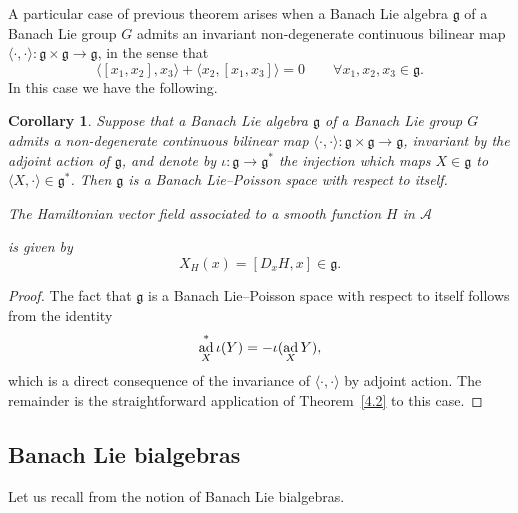 \documentclass[a4paper,12pt,reqno]{amsart}%
\newtheorem{corollary}[theorem]{Corollary}
\theoremstyle{definition}
\theoremstyle{remark}
\numberwithin{theorem}{section}
\numberwithin{equation}{section}
\newcommand{\1}{{\bf 1}}
\DeclareMathOperator{\ad}{\textnormal{ad}}
\newcommand{\g}{{\mathfrak g}}
\begin{document}
A particular case of previous theorem arises when a Banach Lie algebra $\g$ of a Banach Lie group $G$ admits an invariant non-degenerate continuous bilinear map $\langle\cdot,\cdot\rangle:\g\times\g\rightarrow\g$, in the sense that 
\[
\langle [x_1, x_2], x_3\rangle + \langle x_2, [x_1, x_3]\rangle = 0 \quad\quad\forall x_1, x_2, x_3 \in \mathfrak{g}.
\]
In this case we have the following.

\begin{corollary}\label{g_lie_poisson}
    Suppose that a Banach Lie algebra $\g$ of a Banach Lie group $G$ admits a non-degenerate continuous bilinear map $\langle\cdot,\cdot\rangle:\g\times\g\rightarrow\g$, invariant by the adjoint action of $\g$, and denote by $\iota:\g\rightarrow \g^*$ the injection which maps $X\in\g$ to $\langle X, \cdot\rangle\in\g^*$. Then $\g$ is a Banach Lie--Poisson space with respect to itself.
 
The Hamiltonian vector field associated to a smooth function $H$ in $\mathcal A$

is given by
\[
X_H(x) = [D_xH, x] \in\mathfrak{g}.
\]
\end{corollary}

\begin{proof}
The fact that $\g$ is a Banach Lie--Poisson space with respect to itself follows from the identity
 \[
\ad_X^*\iota(Y) = -\iota(\ad_X Y),
 \]
which is a direct consequence of the invariance of $\langle\cdot,\cdot\rangle$ by adjoint action. The remainder is the straightforward application of Theorem~\ref{4.2} to this case.
\end{proof}

\subsection{Banach Lie bialgebras}
Let us recall from \cite{tumpach-bruhat} the notion of Banach Lie bialgebras. 
\end{document}
